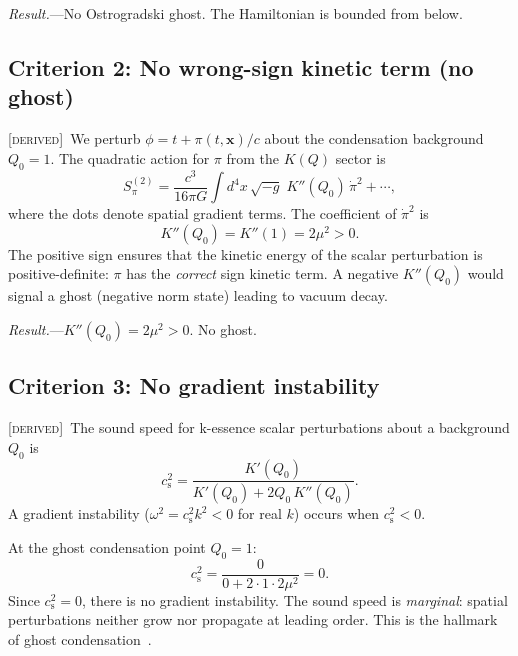 \documentclass[prd,twocolumn,superscriptaddress,longbibliography,floatfix]{revtex4-2}
\newcommand{\cs}{c_{\mathrm{s}}}
\newcommand{\derived}{\textsc{[derived]}}
\begin{document}
\textit{Result.}---No Ostrogradski ghost.  The Hamiltonian is bounded from
below.  \checkmark


\subsection{Criterion 2: No wrong-sign kinetic term (no ghost)}
\label{sec:kinetic}

\derived\ We perturb $\phi = t + \pi(t,\bm{x})/c$ about the
condensation background $Q_0 = 1$.  The quadratic action for $\pi$
from the $K(Q)$ sector is~\cite{AHCLM2004,BS2024}
\begin{equation}
S_\pi^{(2)} = \frac{c^3}{16\pi G}
\int\!d^4x\,\sqrt{-g}\;K''(Q_0)\,\dot\pi^2 + \cdots,
\label{eq:S2_kinetic}
\end{equation}
where the dots denote spatial gradient terms.  The coefficient
of $\dot\pi^2$ is
\begin{equation}
K''(Q_0) = K''(1) = 2\mu^2 > 0.
\label{eq:kinetic_sign}
\end{equation}
The positive sign ensures that the kinetic energy of the
scalar perturbation is positive-definite: $\pi$ has the
\emph{correct} sign kinetic term.  A negative $K''(Q_0)$
would signal a ghost (negative norm state) leading to
vacuum decay.

\textit{Result.}---$K''(Q_0) = 2\mu^2 > 0$.  No ghost.
\checkmark


\subsection{Criterion 3: No gradient instability}
\label{sec:gradient}

\derived\ The sound speed for k-essence scalar perturbations
about a background $Q_0$ is~\cite{ArmendarizPicon1999,BS2024}
\begin{equation}
\cs^2 = \frac{K'(Q_0)}{K'(Q_0) + 2Q_0\,K''(Q_0)}.
\label{eq:cs2}
\end{equation}
A gradient instability ($\omega^2 = \cs^2 k^2 < 0$ for real $k$)
occurs when $\cs^2 < 0$.

At the ghost condensation point $Q_0 = 1$:
\begin{equation}
\cs^2 = \frac{0}{0 + 2 \cdot 1 \cdot 2\mu^2} = 0.
\label{eq:cs2_value}
\end{equation}
Since $\cs^2 = 0$, there is no gradient instability.  The
sound speed is \emph{marginal}: spatial perturbations neither
grow nor propagate at leading order.  This is the hallmark of
ghost condensation~\cite{AHCLM2004}.
\end{document}
